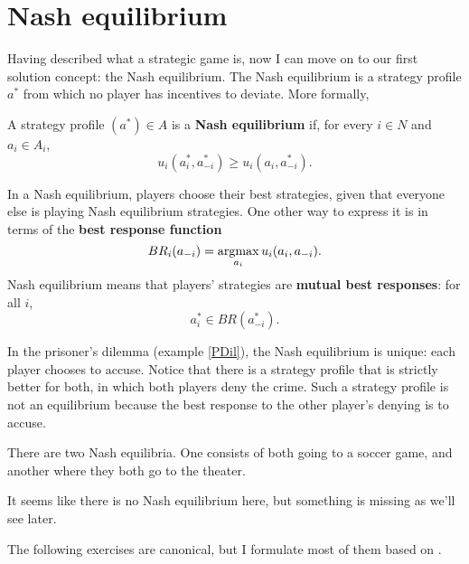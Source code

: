 \documentclass[../../main.tex]{subfiles}
\begin{document}
    \section{Nash equilibrium}
    Having described what a strategic game is, now I can move on to our first solution concept: the Nash equilibrium. The Nash equilibrium is a strategy profile $a^*$ from which no player has incentives to deviate. More formally, 
    \begin{mydef}
        A strategy profile $(a^*)\in A$ is a \textbf{Nash equilibrium} if, for every $i\in N$ and $a_i\in A_i$,
        \[
            u_i(a_i^*,a_{-i}^*) \ge u_i(a_i,a_{-i}^*).
        \]
    \end{mydef}
    In a Nash equilibrium, players choose their best strategies, given that everyone else is playing Nash equilibrium strategies. One other way to express it is in terms of the \textbf{best response function}
    \begin{equation}
        \label{Eq:NEBR}
        BR_i(a_{-i}) = \operatorname*{argmax}_{a_i}u_i(a_i,a_{-i}).
    \end{equation}
    Nash equilibrium means that players' strategies are \textbf{mutual best responses}: for all $i$,
    \[
        a_i^*\in BR(a_{-i}^*).
    \]
    \begin{myex}
        In the prisoner's dilemma (example \ref{PDil}), the Nash equilibrium is unique: each player chooses to accuse. Notice that there is a strategy profile that is strictly better for both, in which both players deny the crime. Such a strategy profile is not an equilibrium because the best response to the other player's denying is to accuse.
    \end{myex}

    \begin{myex}
        There are two Nash equilibria. One consists of both going to a soccer game, and another where they both go to the theater. 
    \end{myex}
    \begin{myex}
        It seems like there is no Nash equilibrium here, but something is missing as we'll see later.
    \end{myex}

    The following exercises are canonical, but I formulate most of them based on \cite{OR}.
\end{document}
